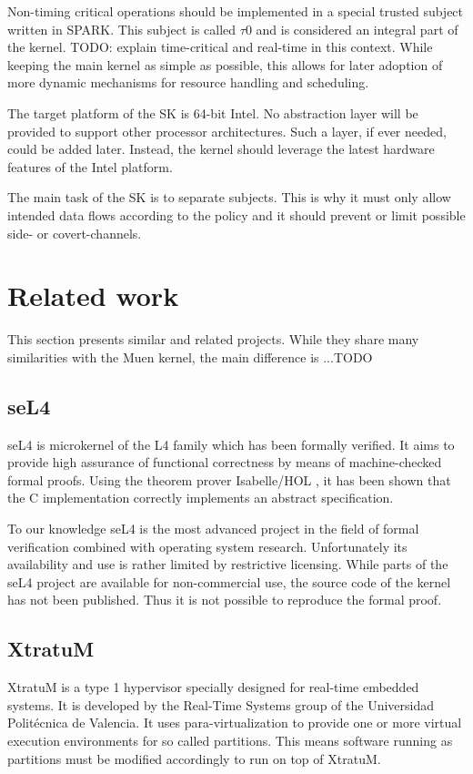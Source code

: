 Non-timing critical operations should be implemented in a special trusted
subject written in SPARK. This subject is called $\tau$0 and is considered an
integral part of the kernel. TODO: explain time-critical and real-time in this
context. While keeping the main kernel as simple as possible, this allows for
later adoption of more dynamic mechanisms for resource handling and scheduling.

The target platform of the SK is 64-bit Intel. No abstraction layer will be
provided to support other processor architectures. Such a layer, if ever needed,
could be added later. Instead, the kernel should leverage the latest hardware
features of the Intel platform.

The main task of the SK is to separate subjects. This is why it must only allow
intended data flows according to the policy and it should prevent or limit
possible side- or covert-channels.

\section{Related work}
This section presents similar and related projects. While they share many
similarities with the Muen kernel, the main difference is ...TODO

\subsection{seL4}
seL4 is microkernel of the L4 \cite{Liedtke:1996:TRM:234215.234473} family which
has been formally verified. It aims to provide high assurance of functional
correctness by means of machine-checked formal proofs. Using the theorem prover
Isabelle/HOL \cite{Nipkow-Paulson-Wenzel:2002}, it has been shown that the C
implementation correctly implements an abstract specification.

To our knowledge seL4 is the most advanced project in the field of formal
verification combined with operating system research. Unfortunately its
availability and use is rather limited by restrictive licensing. While parts of
the seL4 project are available for non-commercial use, the source code of the
kernel has not been published. Thus it is not possible to reproduce the formal
proof.

\subsection{XtratuM}
XtratuM is a type 1 hypervisor specially designed for real-time embedded
systems. It is developed by the Real-Time Systems group of the Universidad
Politécnica de Valencia. It uses para-virtualization to provide one or more
virtual execution environments for so called partitions. This means software
running as partitions must be modified accordingly to run on top of XtratuM.


